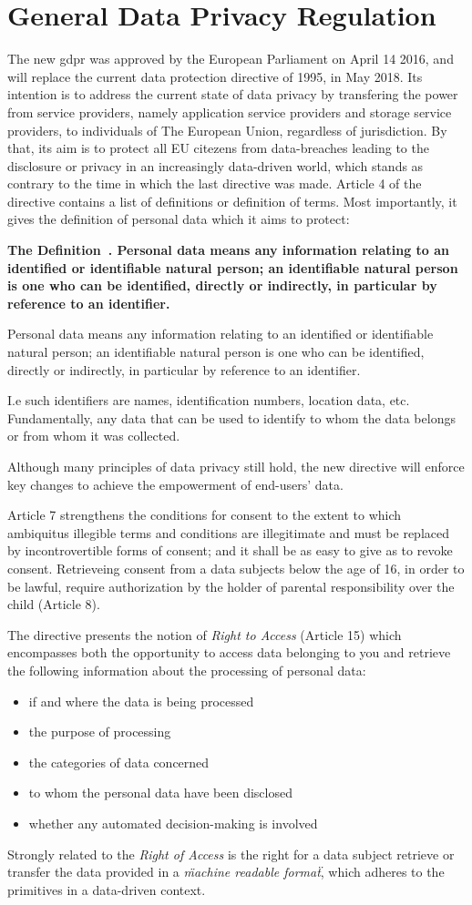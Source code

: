 \documentclass[USenglish]{uit-thesis}
\newcommand{\definition}[1]{%
  \refstepcounter{definition}%
  \par\noindent\textbf{The Definition~\thedefinition. #1}%
  \addcontentsline{def}{definition}
    {\protect\numberline{\thechapter.\thedefinition}#1}\par%
}
\begin{document}
\chapter{General Data Privacy Regulation}
The new \gls{gdpr} \cite{regulation2016regulation} was approved by the European Parliament on April 14 2016, and will replace the current
data protection directive of 1995, in May 2018.
Its intention is to address the current state of data privacy by transfering the power from
service providers, namely application service providers and storage service providers,
to individuals of The European Union, regardless of jurisdiction.
By that, its aim is to protect all EU citezens from data-breaches leading to
the disclosure or privacy in an increasingly data-driven world, which stands as
contrary to the time in which the last directive was made.
Article 4 of the directive contains a list of definitions or definition of terms.
Most importantly, it gives the definition of personal data which it aims to protect:

\definition{Personal data means any information relating to an identified or identifiable natural person;
            an identifiable natural person is one who can be identified, directly or indirectly, in particular by reference
            to an identifier.}

I.e such identifiers are names, identification numbers, location data, etc.
Fundamentally, any data that can be used to identify to whom the data belongs or from whom it was collected.

Although many principles of data privacy still hold,
the new directive will enforce key changes to achieve the empowerment of end-users' data.

Article 7 strengthens the conditions for consent to the extent to which
ambiquitus illegible terms and conditions are illegitimate and must be replaced
by incontrovertible forms of consent; and it shall be as easy to give as to
revoke consent.
Retrieveing consent from a data subjects below the age of 16, in order to be lawful,
require authorization by the holder of parental responsibility over the child (Article 8).

The directive presents the notion of \textit{Right to Access} (Article 15) which encompasses
both the opportunity to access data belonging to you and retrieve the following information about
the processing of personal data:
\begin{itemize}
    \item if and where the data is being processed
    \item the purpose of processing
    \item the categories of data concerned
    \item to whom the personal data have been disclosed
    \item whether any automated decision-making is involved
\end{itemize}
Strongly related to the \textit{Right of Access} is the right for a data subject
retrieve or transfer the data provided in a \textit{\"machine readable format\"},
which adheres to the primitives in a data-driven context.
\end{document}
